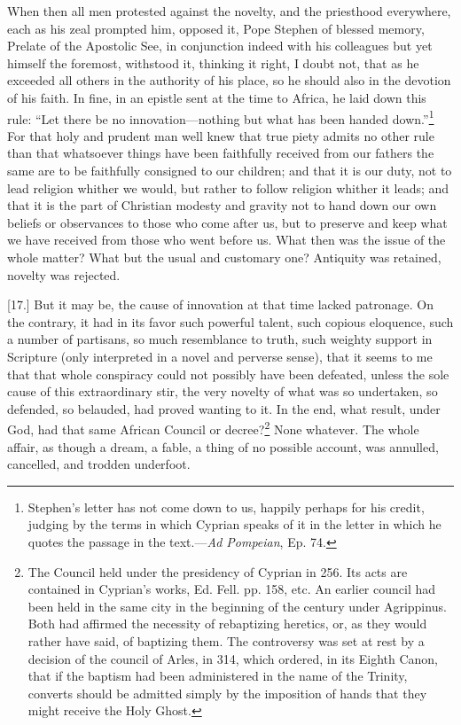 When then all men protested against the novelty, and the priesthood everywhere, each as his zeal prompted him, opposed it, Pope Stephen of blessed memory, Prelate of the Apostolic See, in conjunction indeed with his colleagues but yet himself the foremost, withstood it, thinking it right, I doubt not, that as he exceeded all others in the authority of his place, so he should also in the devotion of his faith. In fine, in an epistle sent at the time to Africa, he laid down this rule: “Let there be no innovation—nothing but what has been handed down.”\footnote{Stephen’s letter has not come down to us, happily perhaps for his credit, judging by the terms in which Cyprian speaks of it in the letter in which he quotes the passage in the text.—\emph{Ad Pompeian}, Ep. 74.} For that holy and prudent man well knew that true piety admits no other rule than that whatsoever things have been faithfully received from our fathers the same are to be faithfully consigned to our children; and that it is our duty, not to lead religion whither we would, but rather to follow religion whither it leads; and that it is the part of Christian modesty and gravity not to hand down our own beliefs or observances to those who come after us, but to preserve and keep what we have received from those who went before us. What then was the issue of the whole matter? What but the usual and customary one? Antiquity was retained, novelty was rejected.

[17.] But it may be, the cause of innovation at that time lacked patronage. On the contrary, it had in its favor such powerful talent, such copious eloquence, such a number of partisans, so much resemblance to truth, such weighty support in Scripture (only interpreted in a novel and perverse sense), that it seems to me that that whole conspiracy could not possibly have been defeated, unless the sole cause of this extraordinary stir, the very novelty of what was so undertaken, so defended, so belauded, had proved wanting to it. In the end, what result, under God, had that same African Council or decree?\footnote{The Council held under the presidency of Cyprian in 256. Its acts are contained in Cyprian’s works, Ed. Fell. pp. 158, etc. An earlier council had been held in the same city in the beginning of the century under Agrippinus. Both had affirmed the necessity of rebaptizing heretics, or, as they would rather have said, of baptizing them. The controversy was set at rest by a decision of the council of Arles, in 314, which ordered, in its Eighth Canon, that if the baptism had been administered in the name of the Trinity, converts should be admitted simply by the imposition of hands that they might receive the Holy Ghost.} None whatever. The whole affair, as though a dream, a fable, a thing of no possible account, was annulled, cancelled, and trodden underfoot.

